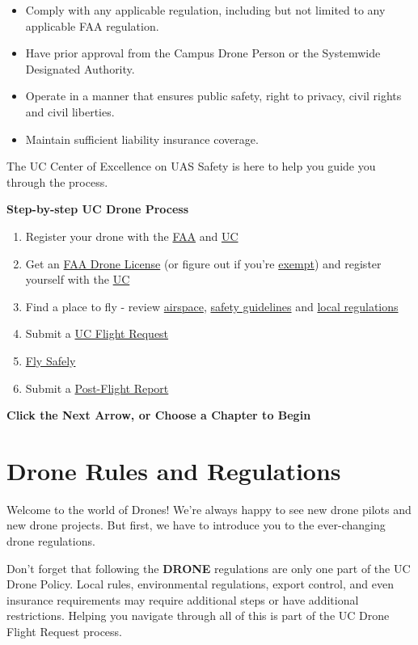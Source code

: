\documentclass[
  12pt,
]{book}
\providecommand{\tightlist}{%
  \setlength{\itemsep}{0pt}\setlength{\parskip}{0pt}}
\newenvironment{notebox}{
  \definecolor{shadecolor}{gray}{.8}  %
  \color{black}
  \begin{shaded}}
 {\end{shaded}}
\begin{document}
\begin{itemize}
\tightlist
\item
  Comply with any applicable regulation, including but not limited to any applicable FAA regulation.
\item
  Have prior approval from the Campus Drone Person or the Systemwide Designated Authority.
\item
  Operate in a manner that ensures public safety, right to privacy, civil rights and civil liberties.
\item
  Maintain sufficient liability insurance coverage.
\end{itemize}

The UC Center of Excellence on UAS Safety is here to help you guide you through the process.

\textbf{Step-by-step UC Drone Process}

\begin{enumerate}
\def\labelenumi{\arabic{enumi}.}
\tightlist
\item
  Register your drone with the \hyperref[registration]{FAA} and \hyperref[UCDrones-drone]{UC}
\item
  Get an \hyperref[license]{FAA Drone License} (or figure out if you're \hyperref[difference]{exempt}) and register yourself with the \hyperref[UCDrones-pilot]{UC}
\item
  Find a place to fly - review \hyperref[airspace-info]{airspace}, \hyperref[safety]{safety guidelines} and \hyperref[local-regulations]{local regulations}
\item
  Submit a \hyperref[UCDrones-project]{UC Flight Request}
\item
  \hyperref[tips]{Fly Safely}
\item
  Submit a \hyperref[UCDrones-post]{Post-Flight Report}
\end{enumerate}

\textbf{Click the Next Arrow, or Choose a Chapter to Begin}

\chapter{Drone Rules and Regulations}\label{regulations}

Welcome to the world of Drones! We're always happy to see new drone pilots and new drone projects. But first, we have to introduce you to the ever-changing drone regulations.

\begin{notebox}
Don't forget that following the \textbf{DRONE} regulations are only one part of the UC Drone Policy. Local rules, environmental regulations, export control, and even insurance requirements may require additional steps or have additional restrictions. Helping you navigate through all of this is part of the UC Drone Flight Request process.

\end{notebox}
\end{document}
